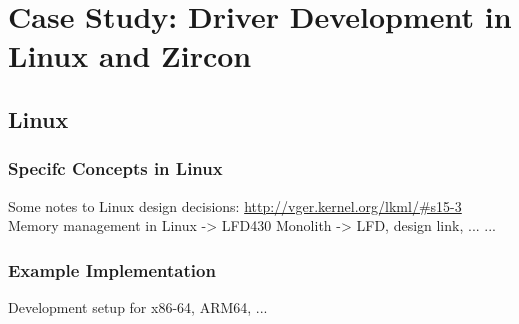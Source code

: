 
\chapter{Case Study: Driver Development in Linux and Zircon} \label{ch:case-study}


\section{Linux} \label{sec:cs-linux}

\subsection{Specifc Concepts in Linux} \label{subsec:concepts-linux}
    Some notes to Linux design decisions: \url{http://vger.kernel.org/lkml/#s15-3}
    Memory management in Linux -> LFD430
    Monolith -> LFD, design link, ...
    ...

\subsection{Example Implementation} %
    Development setup for x86-64, ARM64, ...
